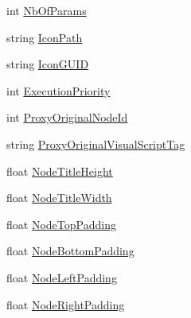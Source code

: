 \begin{DoxyCompactItemize}
int \hyperlink{classi_c_s___editor_object_a44e579e540626cd82bd78e74a9024971}{Nb\+Of\+Params}
\item 
string \hyperlink{classi_c_s___editor_object_a9c93781b73b437d64b59e8e926437604}{Icon\+Path}
\item 
string \hyperlink{classi_c_s___editor_object_aef7b4971840ed269717d65c5c6740063}{Icon\+G\+U\+I\+D}
\item 
int \hyperlink{classi_c_s___editor_object_aca7763f63d61d159f0d24e065459cf36}{Execution\+Priority}
\item 
int \hyperlink{classi_c_s___editor_object_a2b1d129fb783ec3efe889f720627aa2f}{Proxy\+Original\+Node\+Id}
\item 
string \hyperlink{classi_c_s___editor_object_afe44795d37172ff28b6a05f94f2130b6}{Proxy\+Original\+Visual\+Script\+Tag}
\item 
float \hyperlink{classi_c_s___editor_object_acc0e19bc223b255ad8b2b64cf588ed20}{Node\+Title\+Height}
\item 
float \hyperlink{classi_c_s___editor_object_a58fcc888ee7fbda2af72bebf95b7e143}{Node\+Title\+Width}
\item 
float \hyperlink{classi_c_s___editor_object_ab0b08f07875c10b419b5884e025f8543}{Node\+Top\+Padding}
\item 
float \hyperlink{classi_c_s___editor_object_ad0ac325d65c83af402928f8d3108730b}{Node\+Bottom\+Padding}
\item 
float \hyperlink{classi_c_s___editor_object_a2cedb0458c735ebbdb00dfc4657032d6}{Node\+Left\+Padding}
\item 
float \hyperlink{classi_c_s___editor_object_aa13b13743ff0ece2de3e470c9e0b95ee}{Node\+Right\+Padding}

\end{DoxyCompactItemize}
